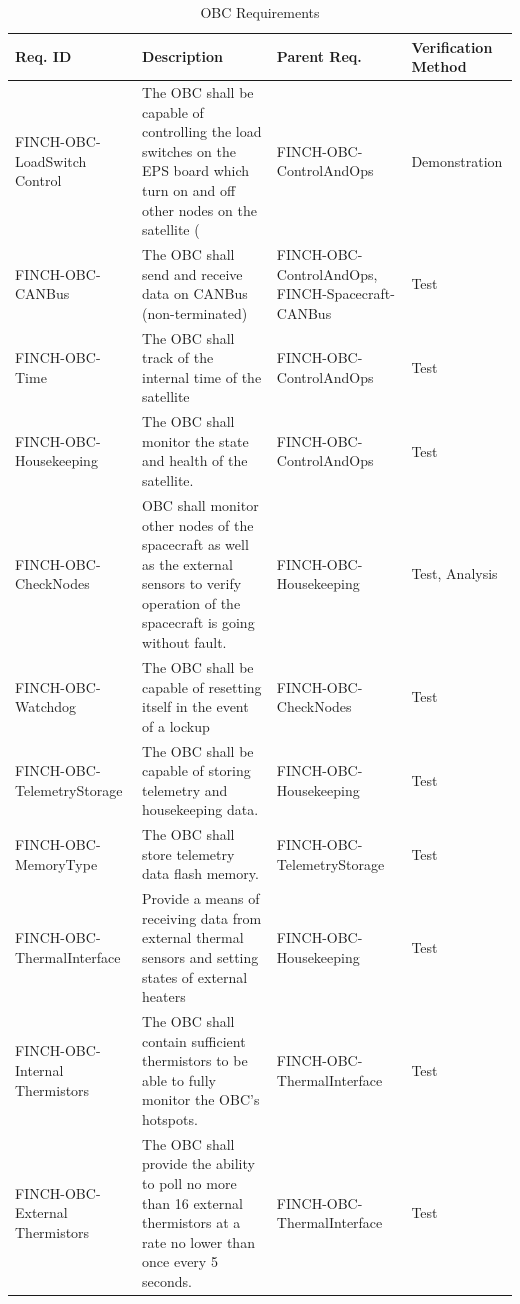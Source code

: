 \documentclass[12pt,a4paper]{article}
\begin{document}
    \begin{table}[H]
        \centering
        \begin{tabular}{|>{\centering\arraybackslash}m{3cm} 
                    |>{\raggedright\arraybackslash}m{7cm} 
                    |>{\centering\arraybackslash}m{3cm} 
                    |>{\centering\arraybackslash}m{2.5cm}|}\hline
            \textbf{Req. ID} & \centering \textbf{Description} & \textbf{Parent Req.} & \textbf{Verification Method}\\\hline
             FINCH-OBC-LoadSwitch Control&      The OBC shall be capable of controlling the load switches on the EPS board which turn on and off other nodes on the satellite (&  FINCH-OBC-ControlAndOps& Demonstration\\\hline
             FINCH-OBC-CANBus&  The OBC shall send and receive data on CANBus (non-terminated)&  FINCH-OBC-ControlAndOps, FINCH-Spacecraft-CANBus& Test\\\hline
             FINCH-OBC-Time&  The OBC shall track of the internal time of the satellite&  FINCH-OBC-ControlAndOps& Test\\\hline
             FINCH-OBC-Housekeeping&  The OBC shall monitor the state and health of the satellite.&  FINCH-OBC-ControlAndOps& Test\\\hline
             FINCH-OBC-CheckNodes&  OBC shall monitor other nodes of the spacecraft as well as the external sensors to verify operation of the spacecraft is going without fault. &  FINCH-OBC-Housekeeping& Test, Analysis\\\hline
             FINCH-OBC-Watchdog&  The OBC shall be capable of resetting itself in the event of a lockup&  FINCH-OBC-CheckNodes& Test\\ \hline
 FINCH-OBC-TelemetryStorage& The OBC shall be capable of storing telemetry and housekeeping data.& FINCH-OBC-Housekeeping&Test\\\hline
 FINCH-OBC-MemoryType& The OBC shall store telemetry data flash memory.& FINCH-OBC-TelemetryStorage&Test\\\hline
 FINCH-OBC-ThermalInterface& Provide a means of receiving data from external thermal sensors and setting states of external heaters& FINCH-OBC-Housekeeping&Test\\\hline
 FINCH-OBC-Internal Thermistors& The OBC shall contain sufficient thermistors to be able to fully monitor the OBC’s hotspots.& FINCH-OBC-ThermalInterface&Test\\\hline
 FINCH-OBC-External Thermistors& The OBC shall provide the ability to poll no more than 16 external thermistors at a rate no lower than once every 5 seconds.& FINCH-OBC-ThermalInterface&Test\\\hline
        \end{tabular}
        \caption{OBC Requirements}
        \label{tab:placeholder}
    \end{table}
\end{document}
